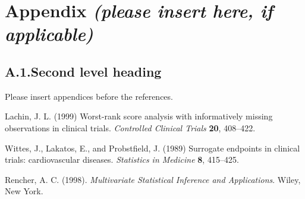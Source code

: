 \documentclass[bimj,fleqn]{w-art}\usepackage[]{graphicx}\usepackage[]{color}
\theoremstyle{plain}
\theoremstyle{definition}
\begin{document}
  \section*{Appendix {\it(please insert here, if applicable)}}

  \subsection*{A.1.\enspace Second level heading}

  Please insert appendices before the references.

  \begin{thebibliography}{10}
  Lachin, J. L. (1999) Worst-rank score analysis with informatively missing observations in clinical trials.  \textit{Controlled Clinical Trials} \textbf{20}, 408–422.

  Wittes, J., Lakatos, E., and Probstfield, J. (1989) Surrogate endpoints in clinical trials: cardiovascular diseases. \textit{Statistics in Medicine} \textbf{8}, 415–425.


  Rencher, A. C. (1998).  \textit{Multivariate Statistical Inference and Applications}. Wiley, New  York.
  \end{thebibliography}
  \newpage
  \phantom{aaaa}
  
\end{document}
